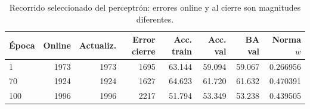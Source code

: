 \begin{table}[htbp]
\centering\small
\caption{Recorrido seleccionado del perceptrón: errores online y al cierre son magnitudes diferentes.}\label{tab:conv-p}
\begin{tabular}{lrrrrrrr}\toprule
Época & Online & Actualiz. & Error cierre & Acc. train & Acc. val & BA val & Norma $w$ \\ \midrule
1 & 1973 & 1973 & 1695 & 63.144 & 59.094 & 59.067 & 0.266956 \\
70 & 1924 & 1924 & 1627 & 64.623 & 61.720 & 61.632 & 0.470391 \\
100 & 1996 & 1996 & 2217 & 51.794 & 53.349 & 53.238 & 0.439505 \\
\bottomrule\end{tabular}
\end{table}
